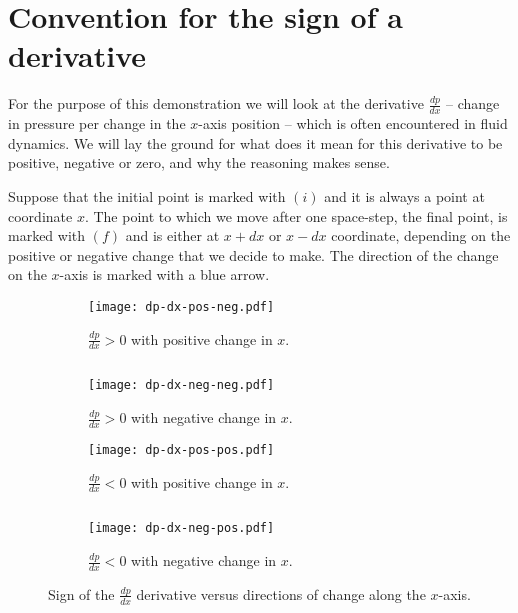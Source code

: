 \section{Convention for the sign of a derivative}

For the purpose of this demonstration we will look at the derivative $\frac{dp}{dx}$ -- change in pressure per change in the $x$-axis position -- which is often encountered in fluid dynamics. We will lay the ground for what does it mean for this derivative to be positive, negative or zero, and why the reasoning makes sense.

Suppose that the initial point is marked with \textcolor{myblue}{$(i)$} and it is always a point at coordinate $x$. The point to which we move after one space-step, the final point, is marked with \textcolor{myblue}{$(f)$} and is either at $x+dx$ or $x - dx$ coordinate, depending on the positive or negative change that we decide to make. The direction of the change on the $x$-axis is marked with a blue arrow.

\begin{figure}[H]
\begin{subfigure}[t]{.46\textwidth}
\centering
\texttt{[image: dp-dx-pos-neg.pdf]}
\caption{$\frac{dp}{dx} > 0$ with positive change in $x$.}
\end{subfigure}
\begin{minipage}[t]{.07\textwidth}
$ $
\vspace*{1.5cm}
\end{minipage}
\begin{subfigure}[t]{.46\textwidth}
\centering
\texttt{[image: dp-dx-neg-neg.pdf]}
\caption{$\frac{dp}{dx} > 0$ with negative change in $x$.}
\end{subfigure}
\begin{subfigure}[t]{.46\textwidth}
\centering
\texttt{[image: dp-dx-pos-pos.pdf]}
\caption{$\frac{dp}{dx} < 0$ with positive change in $x$.}
\end{subfigure}
\begin{minipage}[t]{.08\textwidth}
$ $
\end{minipage}
\begin{subfigure}[t]{.46\textwidth}
\centering
\texttt{[image: dp-dx-neg-pos.pdf]}
\caption{$\frac{dp}{dx} < 0$ with negative change in $x$.}
\end{subfigure}
\caption{Sign of the $\frac{dp}{dx}$ derivative versus directions of change along the $x$-axis.}
\label{fig:dp-dx-signs}
\end{figure}

